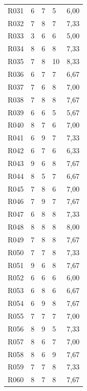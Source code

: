 {\begin{longtable}{L{1.05cm}R{2.1cm}R{2.1cm}R{2.1cm}R{3.0cm}}
R031 & 6 & 7 & 5 & 6,00 \\
R032 & 7 & 8 & 7 & 7,33 \\
R033 & 3 & 6 & 6 & 5,00 \\
R034 & 8 & 6 & 8 & 7,33 \\
R035 & 7 & 8 & 10 & 8,33 \\
R036 & 6 & 7 & 7 & 6,67 \\
R037 & 7 & 6 & 8 & 7,00 \\
R038 & 7 & 8 & 8 & 7,67 \\
R039 & 6 & 6 & 5 & 5,67 \\
R040 & 8 & 7 & 6 & 7,00 \\
R041 & 6 & 9 & 7 & 7,33 \\
R042 & 6 & 7 & 6 & 6,33 \\
R043 & 9 & 6 & 8 & 7,67 \\
R044 & 8 & 5 & 7 & 6,67 \\
R045 & 7 & 8 & 6 & 7,00 \\
R046 & 7 & 9 & 7 & 7,67 \\
R047 & 6 & 8 & 8 & 7,33 \\
R048 & 8 & 8 & 8 & 8,00 \\
R049 & 7 & 8 & 8 & 7,67 \\
R050 & 7 & 7 & 8 & 7,33 \\
R051 & 9 & 6 & 8 & 7,67 \\
R052 & 6 & 6 & 6 & 6,00 \\
R053 & 6 & 8 & 6 & 6,67 \\
R054 & 6 & 9 & 8 & 7,67 \\
R055 & 7 & 7 & 7 & 7,00 \\
R056 & 8 & 9 & 5 & 7,33 \\
R057 & 8 & 6 & 7 & 7,00 \\
R058 & 8 & 6 & 9 & 7,67 \\
R059 & 7 & 7 & 8 & 7,33 \\
R060 & 8 & 7 & 8 & 7,67 \\
\end{longtable}
}

